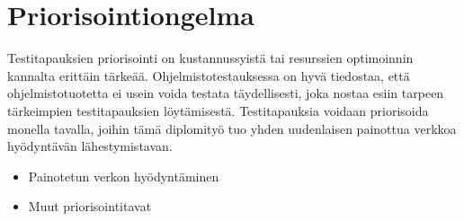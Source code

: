 \section{Priorisointiongelma} \label{ch:08_priorisointiongelma}

  Testitapauksien priorisointi on kustannussyistä tai resurssien optimoinnin kannalta erittäin tärkeää.
  Ohjelmistotestauksessa on hyvä tiedostaa, että ohjelmistotuotetta ei usein voida testata täydellisesti, joka nostaa esiin tarpeen tärkeimpien testitapauksien löytämisestä.
  Testitapauksia voidaan priorisoida monella tavalla, joihin tämä diplomityö tuo yhden uudenlaisen painottua verkkoa hyödyntävän lähestymistavan.

  \begin{itemize}
    \item Painotetun verkon hyödyntäminen
    \item Muut priorisointitavat
  \end{itemize}